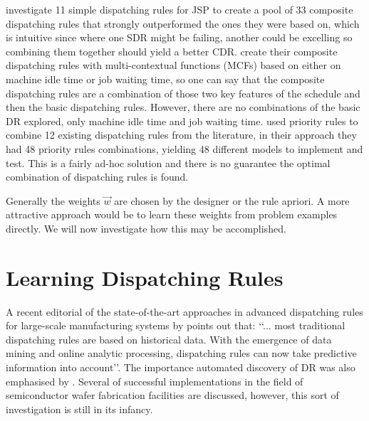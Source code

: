 \documentclass[smallextended]{svjour3}
\begin{document}
\citet{Lu13} investigate 11 simple dispatching rules for JSP to create
a pool of 33 composite dispatching rules that strongly outperformed
the ones they were based on, which is intuitive since where one SDR
might be failing, another could be excelling so combining them
together should yield a better CDR. \citet{Lu13} create their
composite dispatching rules with multi-contextual functions (MCFs)
based on either on machine idle time or job waiting time, so one can
say that the composite dispatching rules are a combination of those
two key features of the schedule and then the basic dispatching
rules. However, there are no combinations of the basic DR explored,
only machine idle time and job waiting time.  \citet{Yu13} used
priority rules to combine 12 existing dispatching rules from the
literature, in their approach they had 48 priority rules combinations,
yielding 48 different models to implement and test. This is a fairly
ad-hoc solution and there is no guarantee the optimal combination of
dispatching rules is found.

	
Generally the weights $\vec{w}$ are chosen by the designer or the rule
apriori.  A more attractive approach would be to learn these weights from problem examples directly. We will now investigate how this may be accomplished.

\section{Learning Dispatching Rules}\label{ch:learningmodels}
	

	
A recent editorial of the state-of-the-art approaches in advanced
dispatching rules for large-scale manufacturing systems by
\citet{Chen13} points out that:
\lq\lq ... most traditional dispatching rules are based on historical
  data. With the emergence of data mining and online analytic
  processing, dispatching rules can now take predictive information
  into account\rq\rq. The importance automated discovery of DR was also emphasised by \cite{Monch13}. 
Several of successful implementations in the field of
semiconductor wafer fabrication facilities are discussed, however, this sort of
investigation is still in its infancy.

\end{document}
